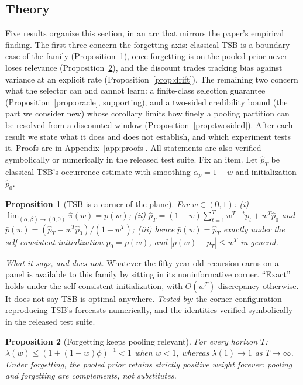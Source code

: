 \documentclass[twocolumn,10pt]{article}
\newtheorem{proposition}{Proposition}
\begin{document}
\subsection{Theory}\label{sec:theory}
Five results organize this section, in an arc that mirrors the paper's
empirical finding. The first three concern the forgetting axis: classical
TSB is a boundary case of the family
(Proposition~\ref{prop:tsb-limit}), once forgetting is on the pooled
prior never loses relevance (Proposition~\ref{prop:active}), and the
discount trades tracking bias against variance at an explicit rate
(Proposition~\ref{prop:drift}). The remaining two concern what the
selector can and cannot learn: a finite-class selection guarantee
(Proposition~\ref{prop:oracle}, supporting), and a two-sided credibility
bound (the part we consider new) whose corollary limits how finely a
pooling partition can be resolved from a discounted window
(Proposition~\ref{prop:twosided}). After each result we state what it
does and does not establish, and which experiment tests it. Proofs are in
Appendix~\ref{app:proofs}. All statements are also verified
symbolically or numerically in the released test suite. Fix an item.
Let $\hat p_T$ be classical TSB's occurrence
estimate with smoothing $\alpha_p=1-w$ and initialization $\hat p_0$.

\begin{proposition}[TSB is a corner of the plane]
\label{prop:tsb-limit}
For $w\in(0,1)$:
(i) $\lim_{(\alpha,\beta)\to(0,0)}\hat\pi(w)=\bar p(w)$;
(ii) $\hat p_T=(1-w)\sum_{t=1}^{T}w^{T-t}p_t+w^T\hat p_0$ and
$\bar p(w)=(\hat p_T-w^T\hat p_0)/(1-w^T)$;
(iii) hence $\bar p(w)=\hat p_T$ exactly under the self-consistent
initialization $\hat p_0=\bar p(w)$, and $|\bar p(w)-\hat p_T|\le w^{T}$
in general.
\end{proposition}

\emph{What it says, and does not.} Whatever the fifty-year-old
recursion earns on a panel is available to this family by sitting in its
noninformative corner. ``Exact'' holds under the self-consistent
initialization, with $O(w^{T})$ discrepancy otherwise. It does not say
TSB is optimal anywhere. \emph{Tested by:} the corner configuration
reproducing TSB's forecasts numerically, and the identities verified
symbolically in the released test suite.

\begin{proposition}[Forgetting keeps pooling relevant]
\label{prop:active}
For every horizon $T$: $\lambda(w)\le(1+(1-w)\phi)^{-1}<1$ when $w<1$,
whereas $\lambda(1)\to1$ as $T\to\infty$. Under forgetting, the pooled
prior retains strictly positive weight forever: pooling and forgetting
are complements, not substitutes.
\end{proposition}
\end{document}
